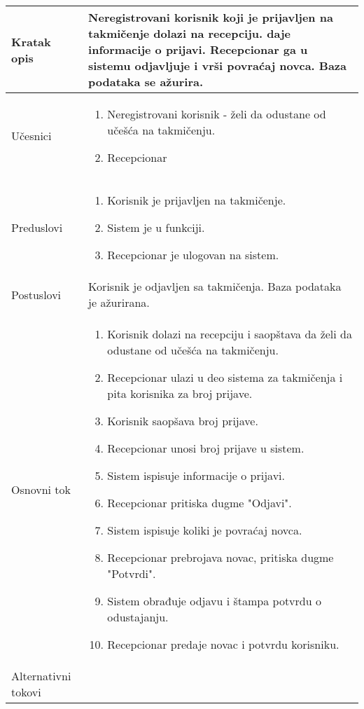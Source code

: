 \documentclass[../../main.tex]{subfiles}
\begin{document}
\begin{longtable}{| p{} | p{} |} 
\hline
    Kratak opis &  Neregistrovani korisnik koji je prijavljen na takmičenje dolazi na recepciju. daje informacije o prijavi. Recepcionar ga u sistemu odjavljuje i vrši povraćaj novca. Baza podataka se ažurira.\\ 
\hline    
    Učesnici & \begin{enumerate}
        \item Neregistrovani korisnik - želi da odustane od učešća na takmičenju. 
        \item Recepcionar
    \end{enumerate}\\
\hline
   Preduslovi & \begin{enumerate}
       \item Korisnik je prijavljen na takmičenje.
       \item Sistem je u funkciji.
       \item Recepcionar je ulogovan na sistem.
   \end{enumerate}\\
\hline  
    Postuslovi & Korisnik je odjavljen sa takmičenja. Baza podataka je ažurirana.\\
\hline
    Osnovni tok & \begin{enumerate}
        \item Korisnik dolazi na recepciju i saopštava da želi da odustane od učešća na takmičenju.
        \item Recepcionar ulazi u deo sistema za takmičenja i pita korisnika za broj prijave.
        \item Korisnik saopšava broj prijave.
        \item Recepcionar unosi broj prijave u sistem. 
        \item Sistem ispisuje informacije o prijavi.
        \item Recepcionar pritiska dugme "Odjavi".
        \item Sistem ispisuje koliki je povraćaj novca. 
        \item Recepcionar prebrojava novac, pritiska dugme "Potvrdi".
        \item Sistem obrađuje odjavu i štampa potvrdu o odustajanju.
        \item Recepcionar predaje novac i potvrdu korisniku.
    \end{enumerate}\\
\hline
    Alternativni tokovi & \begin{itemize}

\end{itemize}
\end{longtable}
\end{document}
